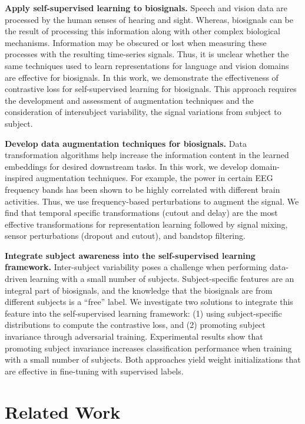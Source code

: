 \documentclass{article}
\renewcommand{\paragraph}[1]{\textbf{#1}\hspace{1em}}
\begin{document}
\paragraph{Apply self-supervised learning to biosignals.} Speech and vision
data are processed by the human senses of hearing and sight. Whereas, biosignals
can be the result of processing this information along with other complex
biological mechanisms. Information may be obscured or lost when measuring these
processes with the resulting time-series signals. Thus, it is unclear whether
the same techniques used to learn representations for language and vision
domains are effective for biosignals. In this work, we demonstrate the
effectiveness of contrastive loss for self-supervised learning for biosignals.
This approach requires the development and assessment of augmentation techniques
and the consideration of intersubject variability, the signal variations from
subject to subject.

\paragraph{Develop data augmentation techniques for biosignals.} Data
transformation algorithms help increase the information content in the learned
embeddings for desired downstream tasks. In this work, we develop
domain-inspired augmentation techniques. For example, the power in certain EEG
frequency bands has been shown to be highly correlated with different brain
activities. Thus, we use frequency-based perturbations to augment the signal. We
find that temporal specific transformations (cutout and delay) are the most
effective transformations for representation learning followed by signal mixing,
sensor perturbations (dropout and cutout), and bandstop filtering.

\paragraph{Integrate subject awareness into the self-supervised learning
framework.} Inter-subject variability poses a challenge when performing
data-driven learning with a small number of subjects. Subject-specific features
are an integral part of biosignals, and the knowledge that the biosignals are
from different subjects is a ``free'' label. We investigate two solutions to
integrate this feature into the self-supervised learning framework: (1) using
subject-specific distributions to compute the contrastive loss, and (2)
promoting subject invariance through adversarial training. Experimental results
show that promoting subject invariance increases classification performance when
training with a small number of subjects. Both approaches yield weight
initializations that are effective in fine-tuning with supervised labels. \section{Related Work}
\end{document}
